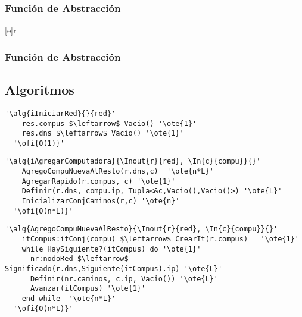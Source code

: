   \subsubsection{Función de Abstracción}

   [e]{r}{
    }
\subsubsection{Función de Abstracción}




\subsection{Algoritmos}

\lstset{style=alg}
\begin{lstlisting}[mathescape]
  '\alg{iIniciarRed}{}{red}'
    res.compus $\leftarrow$ Vacio() '\ote{1}'
    res.dns $\leftarrow$ Vacio() '\ote{1}'
  '\ofi{O(1)}'
\end{lstlisting}

\begin{lstlisting}[mathescape]
  '\alg{iAgregarComputadora}{\Inout{r}{red}, \In{c}{compu}}{}'
    AgregoCompuNuevaAlResto(r.dns,c)  '\ote{n*L}'
    AgregarRapido(r.compus, c) '\ote{1}'  
    Definir(r.dns, compu.ip, Tupla<&c,Vacio(),Vacio()>) '\ote{L}'
    InicializarConjCaminos(r,c) '\ote{n}'
  '\ofi{O(n*L)}'
\end{lstlisting}

\begin{lstlisting}[mathescape]
  '\alg{AgregoCompuNuevaAlResto}{\Inout{r}{red}, \In{c}{compu}}{}'
    itCompus:itConj(compu) $\leftarrow$ CrearIt(r.compus)   '\ote{1}'
    while HaySiguiente?(itCompus) do '\ote{1}'                                                   
      nr:nodoRed $\leftarrow$ Significado(r.dns,Siguiente(itCompus).ip) '\ote{L}'
      Definir(nr.caminos, c.ip, Vacio()) '\ote{L}'
      Avanzar(itCompus) '\ote{1}'
    end while  '\ote{n*L}'
  '\ofi{O(n*L)}'
\end{lstlisting}

